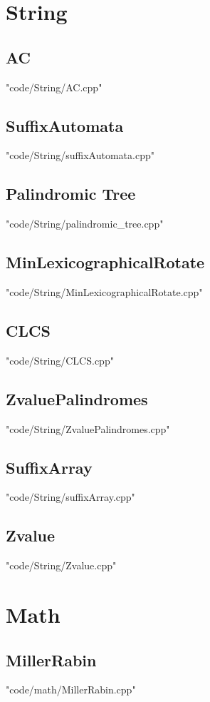 \documentclass [8pt,a4paper,twocolumn]{article}
\begin{document}
\section{String}
\subsection{AC}
 {"code/String/AC.cpp"}
\subsection{SuffixAutomata}
 {"code/String/suffixAutomata.cpp"}
\subsection{Palindromic Tree}
 {"code/String/palindromic_tree.cpp"}
\subsection{MinLexicographicalRotate}
 {"code/String/MinLexicographicalRotate.cpp"}
\subsection{CLCS}
 {"code/String/CLCS.cpp"}
\subsection{ZvaluePalindromes}
 {"code/String/ZvaluePalindromes.cpp"}
\subsection{SuffixArray}
 {"code/String/suffixArray.cpp"}
\subsection{Zvalue}
 {"code/String/Zvalue.cpp"}
\section{Math}
\subsection{MillerRabin}
 {"code/math/MillerRabin.cpp"}
\end{document}
